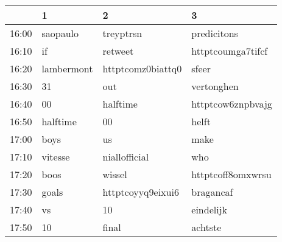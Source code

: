 \begin{table}[ht]
\centering
\begin{tabular}{rlll}
  \hline
 & 1 & 2 & 3 \\ 
  \hline
16:00 & saopaulo & treyptrsn & predicitons \\ 
  16:10 & if & retweet & httptcoumga7tifcf \\ 
  16:20 & lambermont & httptcomz0biattq0 & sfeer \\ 
  16:30 & 31 & out & vertonghen \\ 
  16:40 & 00 & halftime & httptcow6znpbvajg \\ 
  16:50 & halftime & 00 & helft \\ 
  17:00 & boys & us & make \\ 
  17:10 & vitesse & niallofficial & who \\ 
  17:20 & boos & wissel & httptcoff8omxwrsu \\ 
  17:30 & goals & httptcoyyq9eixui6 & bragancaf \\ 
  17:40 & vs & 10 & eindelijk \\ 
  17:50 & 10 & final & achtste \\ 
   \hline
\end{tabular}
\end{table}
